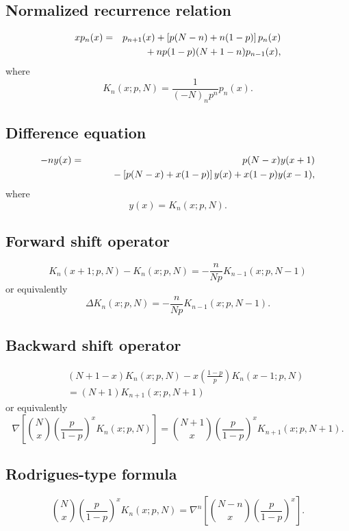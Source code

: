 \documentclass[envcountchap,graybox]{svmono}
\newcommand{\mathindent}{\hspace{7.5mm}}
\begin{document}
\subsection*{Normalized recurrence relation}
\begin{eqnarray}
\label{NormRecKrawtchouk}
xp_n(x)&=&p_{n+1}(x)+\left[p(N-n)+n(1-p)\right]p_n(x)\nonumber\\
& &{}\mathindent{}+np(1-p)(N+1-n)p_{n-1}(x),
\end{eqnarray}
where
$$K_n(x;p,N)=\frac{1}{(-N)_np^n}p_n(x).$$

\subsection*{Difference equation}
\begin{eqnarray}
\label{dvKrawtchouk}
-ny(x)&=&p(N-x)y(x+1)\nonumber\\
& &{}\mathindent{}-\left[p(N-x)+x(1-p)\right]y(x)+x(1-p)y(x-1),
\end{eqnarray}
where
$$y(x)=K_n(x;p,N).$$

\subsection*{Forward shift operator}
\begin{equation}
\label{shift1KrawtchoukI}
K_n(x+1;p,N)-K_n(x;p,N)=-\frac{n}{Np}K_{n-1}(x;p,N-1)
\end{equation}
or equivalently
\begin{equation}
\label{shift1KrawtchoukII}
\Delta K_n(x;p,N)=-\frac{n}{Np}K_{n-1}(x;p,N-1).
\end{equation}

\subsection*{Backward shift operator}
\begin{eqnarray}
\label{shift2KrawtchoukI}
& &(N+1-x)K_n(x;p,N)-x\left(\frac{1-p}{p}\right)K_n(x-1;p,N)\nonumber\\
& &{}=(N+1)K_{n+1}(x;p,N+1)
\end{eqnarray}
or equivalently
\begin{equation}
\label{shift2KrawtchoukII}
\nabla\left[\binom{N}{x}\left(\frac{p}{1-p}\right)^xK_n(x;p,N)\right]=
\binom{N+1}{x}\left(\frac{p}{1-p}\right)^xK_{n+1}(x;p,N+1).
\end{equation}

\subsection*{Rodrigues-type formula}
\begin{equation}
\label{RodKrawtchouk}
\binom{N}{x}\left(\frac{p}{1-p}\right)^xK_n(x;p,N)=
\nabla^n\left[\binom{N-n}{x}\left(\frac{p}{1-p}\right)^x\right].
\end{equation}
\end{document}
